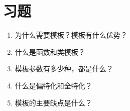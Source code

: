 \section{习题}
\begin{enumerate}
\item
为什么需要模板？模板有什么优势？

\item
什么是函数和类模板？

\item
模板参数有多少种，都是什么？

\item
什么是偏特化和全特化？

\item
模板的主要缺点是什么？
\end{enumerate}